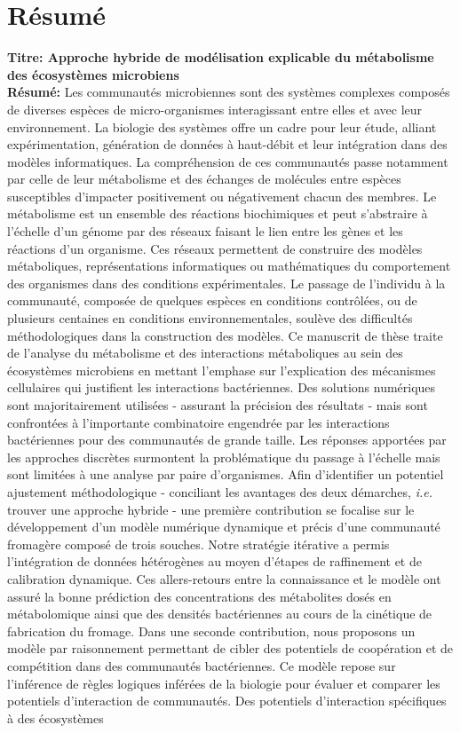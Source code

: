 \documentclass[../main.tex]{subfiles}
\begin{document}
\chapter*{Résumé}

\textbf{Titre: Approche hybride de modélisation explicable du métabolisme des écosystèmes microbiens} \\

\textbf{Résumé:} Les communautés microbiennes sont des systèmes complexes composés de diverses espèces de micro-organismes interagissant entre elles et avec leur environnement. La biologie des systèmes offre un cadre pour leur étude, alliant expérimentation, génération de données à haut-débit et leur intégration dans des modèles informatiques. La compréhension de ces communautés passe notamment par celle de leur métabolisme et des échanges de molécules entre espèces susceptibles d’impacter positivement ou négativement chacun des membres. Le métabolisme est un ensemble des réactions biochimiques et peut s’abstraire à l’échelle d’un génome par des réseaux faisant le lien entre les gènes et les réactions d’un organisme. Ces réseaux permettent de construire des modèles métaboliques, représentations informatiques ou mathématiques du comportement des organismes dans des conditions expérimentales. Le passage de l’individu à la communauté, composée de quelques espèces en conditions contrôlées, ou de plusieurs centaines en conditions environnementales, soulève des difficultés méthodologiques dans la construction des modèles.  Ce manuscrit de thèse traite de l'analyse du métabolisme et des interactions métaboliques au sein des écosystèmes microbiens en mettant l’emphase sur l’explication des mécanismes cellulaires qui justifient les interactions bactériennes. Des solutions numériques sont majoritairement utilisées - assurant la précision des résultats - mais sont confrontées à l'importante combinatoire engendrée par les interactions bactériennes pour des communautés de grande taille. Les réponses apportées par les approches discrètes surmontent la problématique du passage à l'échelle mais sont limitées à une analyse par paire d'organismes. Afin d'identifier un potentiel ajustement méthodologique - conciliant les avantages des deux démarches, \textit{i.e.} trouver une approche hybride - une première contribution se focalise sur le développement d'un modèle numérique dynamique et précis d'une communauté fromagère composé de trois souches. Notre stratégie itérative a permis l'intégration de données hétérogènes au moyen d'étapes de raffinement et de calibration dynamique. Ces allers-retours entre la connaissance et le modèle ont assuré la bonne prédiction des concentrations des métabolites dosés en métabolomique ainsi que des densités bactériennes au cours de la cinétique de fabrication du fromage. Dans une seconde contribution, nous proposons un modèle par raisonnement permettant de cibler des potentiels de coopération et de compétition dans des communautés bactériennes. Ce modèle repose sur l'inférence de règles logiques inférées de la biologie pour évaluer et comparer les potentiels d'interaction de communautés. Des potentiels d'interaction spécifiques à des écosystèmes 
\end{document}
